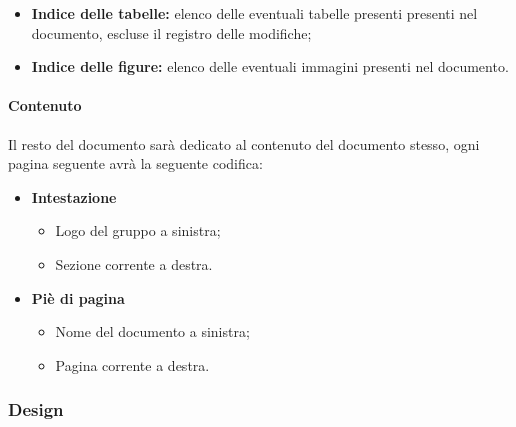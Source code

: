 \documentclass[11pt,a4paper]{article}
\begin{document}
{	\begin{itemize}
		\item \textbf{Indice delle tabelle:} elenco delle eventuali tabelle presenti presenti nel documento, escluse il registro delle modifiche;
		\item  \textbf{Indice delle figure:} elenco delle eventuali immagini presenti nel documento. 
	\end{itemize}
	
	\paragraph{Contenuto\\}
	Il resto del documento sarà dedicato al contenuto del documento stesso, ogni pagina seguente avrà la seguente codifica:
	\begin{itemize}
		\item \textbf{Intestazione}
		\begin{itemize}
			\item Logo del gruppo a sinistra;
			\item Sezione corrente a destra.
		\end{itemize}
		
		\item \textbf{Piè di pagina} 
		\begin{itemize}
			\item Nome del documento a sinistra;
			\item Pagina corrente a destra.
		\end{itemize}
	\end{itemize}
	
	\subsubsection{Design}
	
}
\end{document}

